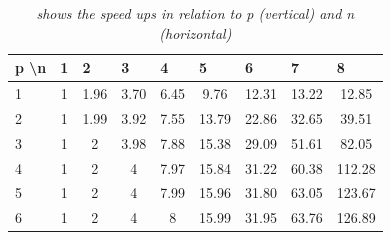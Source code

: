 \documentclass[a4paper,11pt,twoside]{article}
\begin{document}
\begin{table}[ht!]
\centering
\caption{\textit{shows the speed ups in relation to p (vertical) and n (horizontal)}}
\label{tab:speedup}
\begin{tabular}{l|cccccccc}
p \textbackslash n & \multicolumn{1}{l}{1} & \multicolumn{1}{l}{2} & \multicolumn{1}{l}{3} & \multicolumn{1}{l}{4} & \multicolumn{1}{l}{5} & \multicolumn{1}{l}{6} & \multicolumn{1}{l}{7} & \multicolumn{1}{l}{8} \\ \hline
1                  & 1                     & 1.96                  & 3.70                  & 6.45                  & 9.76                  & 12.31                 & 13.22                 & 12.85                 \\
2                  & 1                     & 1.99                  & 3.92                  & 7.55                  & 13.79                 & 22.86                 & 32.65                 & 39.51                 \\
3                  & 1                     & 2                     & 3.98                  & 7.88                  & 15.38                 & 29.09                 & 51.61                 & 82.05                 \\
4                  & 1                     & 2                     & 4                     & 7.97                  & 15.84                 & 31.22                 & 60.38                 & 112.28                \\
5                  & 1                     & 2                     & 4                     & 7.99                  & 15.96                 & 31.80                 & 63.05                 & 123.67                \\
6                  & 1                     & 2                     & 4                     & 8                     & 15.99                 & 31.95                 & 63.76                 & 126.89               
\end{tabular}
\end{table}
\end{document}

